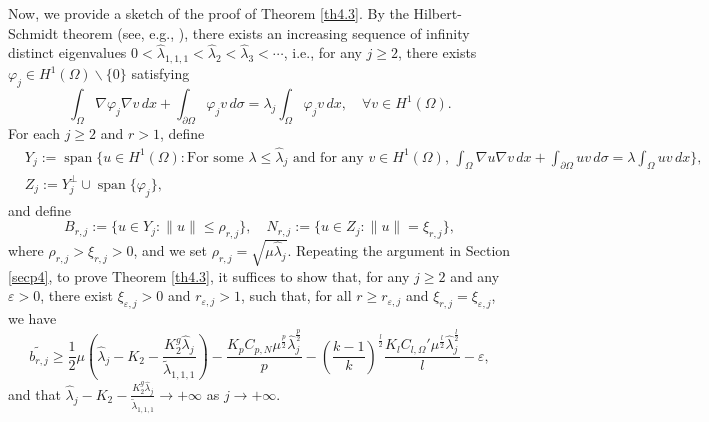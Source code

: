 \documentclass[11pt]{amsart}
\newcommand{\norm}[1]{\lVert#1\rVert}
\numberwithin{equation}{section}
\begin{document}
Now, we provide a sketch of the proof of Theorem \ref{th4.3}. By the Hilbert-Schmidt theorem (see, e.g., \cite[Theorem 7 in Appendix D]{evans}), there exists an increasing sequence of infinity distinct eigenvalues $0<\hat{\lambda}_{1,1,1}<\hat{\lambda}_{2}<\hat{\lambda}_{3}<\cdots$, i.e., for any $j\geq 2$, there exists $\varphi_j \in H^1(\Omega)\backslash\{0\}$ satisfying
$$
\int_\Omega \nabla \varphi_j \nabla v\, dx + \int_{\partial\Omega}\varphi_j v\, d\sigma = \lambda_j\int_{\Omega}\varphi_j v\, dx, \quad \forall v \in H^1(\Omega).
$$
 For each $j \geq 2$ and $r>1$, define
$$
\begin{aligned}
    &Y_j:=\operatorname{span}\{u \in H^1(\Omega):\text{For some }\lambda \leq \hat{\lambda}_{j}\text{ and for any }v \in H^1(\Omega),\,\int_\Omega \nabla u\nabla v\, dx + \int_{\partial\Omega}uv\, d\sigma = \lambda\int_{\Omega}uv\, dx \},\\
    & Z_j:=Y_j^\perp\cup\operatorname{span}\{\varphi_j\},
\end{aligned}
$$
and define
$$
B_{r,j}:=\{u\in Y_j  : \norm{u}\leq \rho_{r,j}\}, \quad N_{r,j}:=\{u\in Z_j : \norm{u}= \xi_{r,j}\},
$$
where $\rho_{r,j}>\xi_{r,j}>0$, and we set $\rho_{r,j}= \sqrt{\mu\hat{\lambda}_{j}}$. Repeating the argument in Section \ref{secp4},  to prove Theorem \ref{th4.3}, it suffices to show that, for any $j \geq 2$ and any $\varepsilon>0$, there exist $\xi_{\varepsilon,j}>0$ and $r_{\varepsilon,j}>1$, such that, for all $r\geq r_{\varepsilon,j}$ and $\xi_{r,j}=\xi_{\varepsilon,j}$, we have
$$ \widetilde{b_{r,j}}\geq\frac{1}{2}\mu(\hat{\lambda}_{j}-K_2-\frac{K_2^g\hat{\lambda}_j}{\tilde{\lambda}_{1,1,1}})-\frac{K_pC_{p,N}\mu^\frac{p}{2}\hat{\lambda}_{j}^\frac{p}{2}}{p}-\left(\frac{k-1}{k}\right)^\frac{l}{2}\frac{K_lC_{l,\Omega}'\mu^\frac{l}{2}\hat{\lambda}_{j}^\frac{l}{2}}{l}-\varepsilon,$$
and that $\hat{\lambda}_{j}-K_2-\frac{K_2^g\hat{\lambda}_j}{\tilde{\lambda}_{1,1,1}} \to +\infty$ as $j \to +\infty$.
\end{document}
